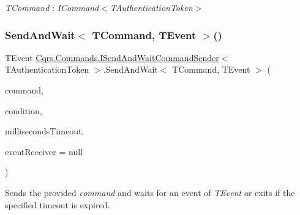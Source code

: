 \begin{Desc}
\item[Type Constraints]\begin{description}
\item[{\em T\+Command} : {\em I\+Command$<$T\+Authentication\+Token$>$}]\end{description}
\end{Desc}
\mbox{\label{interfaceCqrs_1_1Commands_1_1ISendAndWaitCommandSender_a230c249fa137eafc9857c3b73ae86fcd}} 
\subsubsection{\texorpdfstring{Send\+And\+Wait$<$ T\+Command, T\+Event $>$()}{SendAndWait< TCommand, TEvent >()}\hspace{0.1cm}{\footnotesize\ttfamily [5/6]}}
{\footnotesize\ttfamily T\+Event \hyperlink{interfaceCqrs_1_1Commands_1_1ISendAndWaitCommandSender}{Cqrs.\+Commands.\+I\+Send\+And\+Wait\+Command\+Sender}$<$ T\+Authentication\+Token $>$.Send\+And\+Wait$<$ T\+Command, T\+Event $>$ (\begin{DoxyParamCaption}\item[{T\+Command}]{command,  }\item[{Func$<$ I\+Enumerable$<$ \hyperlink{interfaceCqrs_1_1Events_1_1IEvent}{I\+Event}$<$ T\+Authentication\+Token $>$$>$, T\+Event $>$}]{condition,  }\item[{int}]{milliseconds\+Timeout,  }\item[{\hyperlink{interfaceCqrs_1_1Events_1_1IEventReceiver}{I\+Event\+Receiver}$<$ T\+Authentication\+Token $>$}]{event\+Receiver = {\ttfamily null} }\end{DoxyParamCaption})}



Sends the provided {\itshape command}  and waits for an event of {\itshape T\+Event}  or exits if the specified timeout is expired. 


